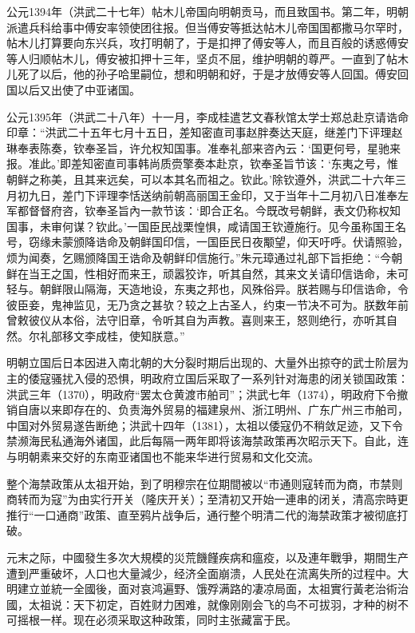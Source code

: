 公元1394年（洪武二十七年）帖木儿帝国向明朝贡马，而且致国书。第二年，明朝派遣兵科给事中傅安率领使团往报。但当傅安等抵达帖木儿帝国国都撒马尔罕时，帖木儿打算要向东兴兵，攻打明朝了，于是扣押了傅安等人，而且百般的诱惑傅安等人归顺帖木儿，傅安被扣押十三年，坚贞不屈，维护明朝的尊严。一直到了帖木儿死了以后，他的孙子哈里嗣位，想和明朝和好，于是才放傅安等人回国。傅安回国以后又出使了中亚诸国。

公元1395年（洪武二十八年）十一月，李成桂遣艺文春秋馆太学士郑总赴京请诰命印章：“洪武二十五年七月十五日，差知密直司事赵胖奏达天庭，继差门下评理赵琳奉表陈奏，钦奉圣旨，许允权知国事。准奉礼部来咨內云：‘国更何号，星驰来报。准此。’即差知密直司事韩尚质赍擎奏本赴京，钦奉圣旨节该：‘东夷之号，惟朝鲜之称美，且其来远矣，可以本其名而祖之。钦此。’除钦遵外，洪武二十六年三月初九日，差门下评理李恬送纳前朝高丽国王金印，又于当年十二月初八日准奉左军都督督府咨，钦奉圣旨內一款节该：‘即合正名。今既改号朝鲜，表文仍称权知国事，未审何谋？钦此。’一国臣民战栗惶惧，咸请国王钦遵施行。见今虽称国王名号，窃缘未蒙颁降诰命及朝鲜国印信，一国臣民日夜颙望，仰天吁呼。伏请照验，烦为闻奏，乞赐颁降国王诰命及朝鲜印信施行。”朱元璋通过礼部下旨拒绝：“今朝鲜在当王之国，性相好而来王，顽嚣狡诈，听其自然，其来文关请印信诰命，未可轻与。朝鲜限山隔海，天造地设，东夷之邦也，风殊俗异。朕若赐与印信诰命，令彼臣妾，鬼神监见，无乃贪之甚欤？较之上古圣人，约束一节决不可为。朕数年前曾敕彼仪从本俗，法守旧章，令听其自为声教。喜则来王，怒则绝行，亦听其自然。尔礼部移文李成桂，使知朕意。”

明朝立国后日本因进入南北朝的大分裂时期后出现的、大量外出掠夺的武士阶层为主的倭寇骚扰入侵的恐惧，明政府立国后采取了一系列针对海患的闭关锁国政策：洪武三年（1370），明政府“罢太仓黄渡市舶司”；洪武七年（1374），明政府下令撤销自唐以来即存在的、负责海外贸易的福建泉州、浙江明州、广东广州三市舶司，中国对外贸易遂告断绝；洪武十四年（1381），太祖以倭寇仍不稍敛足迹，又下令禁濒海民私通海外诸国，此后每隔一两年即将该海禁政策再次昭示天下。自此，连与明朝素来交好的东南亚诸国也不能来华进行贸易和文化交流。

整个海禁政策从太祖开始，到了明穆宗在位期間被以“市通则寇转而为商，市禁则商转而为寇”为由实行开关（隆庆开关）；至清初又开始一連串的闭关，清高宗時更推行“一口通商”政策、直至鸦片战争后，通行整个明清二代的海禁政策才被彻底打破。

元末之际，中國發生多次大規模的災荒饑饉疾病和瘟疫，以及連年戰爭，期間生产遭到严重破坏，人口也大量減少，经济全面崩溃，人民处在流离失所的过程中。大明建立並統一全國後，面对哀鸿遍野、饿殍满路的凄凉局面，太祖實行黃老治術治國，太祖说：天下初定，百姓财力困难，就像刚刚会飞的鸟不可拔羽，才种的树不可摇根一样。现在必须采取这种政策，同时主张藏富于民。

